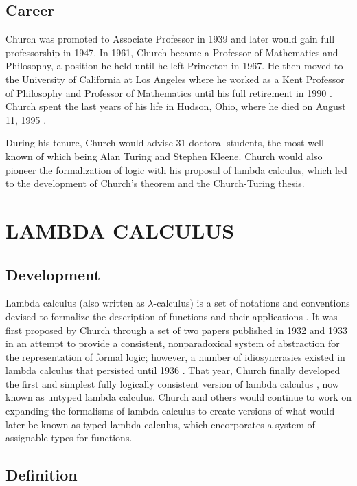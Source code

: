 \documentclass[letterpaper, 10 pt, conference]{ieeeconf}  %
\begin{document}
\subsection{Career}

Church was promoted to Associate Professor in 1939 and later would gain full professorship in 1947. In 1961, Church became a Professor of Mathematics and Philosophy, a position he held until he left Princeton in 1967. He then moved to the University of California at Los Angeles where he worked as a Kent Professor of Philosophy and Professor of Mathematics until his full retirement in 1990 \cite{Connor}. Church spent the last years of his life in Hudson, Ohio, where he died on August 11, 1995 \cite{Britannica}.

During his tenure, Church would advise 31 doctoral students, the most well known of which being Alan Turing and Stephen Kleene. Church would also pioneer the formalization of logic with his proposal of lambda calculus, which led to the development of Church's theorem and the Church-Turing thesis.

\section{LAMBDA CALCULUS}

\subsection{Development}

Lambda calculus (also written as $\lambda$-calculus) is a set of notations and conventions devised to formalize the description of functions and their applications \cite{Deutsch1}. It was first proposed by Church through a set of two papers published in 1932 \cite{Church1} and 1933 \cite{Church2} in an attempt to provide a consistent, nonparadoxical system of abstraction for the representation of formal logic; however, a number of idiosyncrasies existed in lambda calculus that persisted until 1936 \cite{Steinert}. That year, Church finally developed the first and simplest fully logically consistent version of lambda calculus \cite{Church4}, now known as untyped lambda calculus. Church and others would continue to work on expanding the formalisms of lambda calculus to create versions of what would later be known as typed lambda calculus, which encorporates a system of assignable types for functions.

\subsection{Definition}
\end{document}

